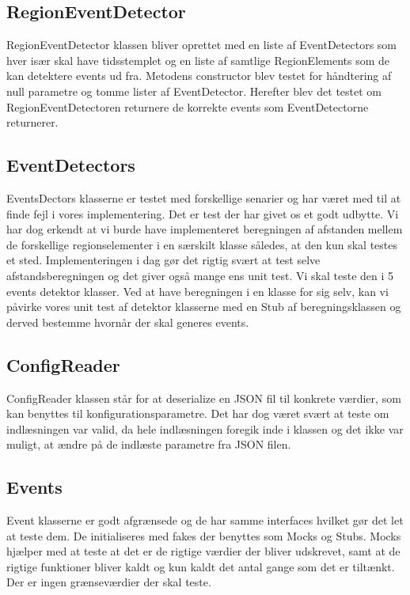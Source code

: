 \subsection{RegionEventDetector}
RegionEventDetector klassen bliver oprettet med en liste af EventDetectors som hver især skal have tidsstemplet og en liste af samtlige RegionElements som de kan detektere events ud fra. Metodens constructor blev testet for håndtering af null parametre og tomme lister af EventDetector. Herefter blev det testet om RegionEventDetectoren returnere de korrekte events som EventDetectorne returnerer.  

\subsection{EventDetectors}
EventsDectors klasserne er testet med forskellige senarier og har været med til at finde fejl i vores implementering. Det er test der har givet os et godt udbytte. Vi har dog erkendt at vi burde have implementeret beregningen af afstanden mellem de forskellige regionselementer i en særskilt klasse således, at den kun skal testes et sted. Implementeringen i dag gør det rigtig svært at test selve afstandsberegningen og det giver også mange ens unit test. Vi skal teste den i 5 events detektor klasser. Ved at have beregningen i en klasse for sig selv, kan vi påvirke vores unit test af detektor klasserne med en Stub af beregningsklassen og derved bestemme hvornår der skal generes events.

\subsection{ConfigReader}
ConfigReader klassen står for at deserialize en JSON fil til konkrete værdier, som kan benyttes til konfigurationsparametre. Det har dog været svært at teste om indlæsningen var valid, da hele indlæsningen foregik inde i klassen og det ikke var muligt, at ændre på de indlæste parametre fra JSON filen.

\subsection{Events}
Event klasserne er godt afgrænsede og de har samme interfaces hvilket gør det let at teste dem. De initialiseres med fakes der benyttes som Mocks og Stubs. Mocks hjælper med at teste at det er de rigtige værdier der bliver udskrevet, samt at de rigtige funktioner bliver kaldt og kun kaldt det antal gange som det er tiltænkt. Der er ingen grænseværdier der skal teste.

